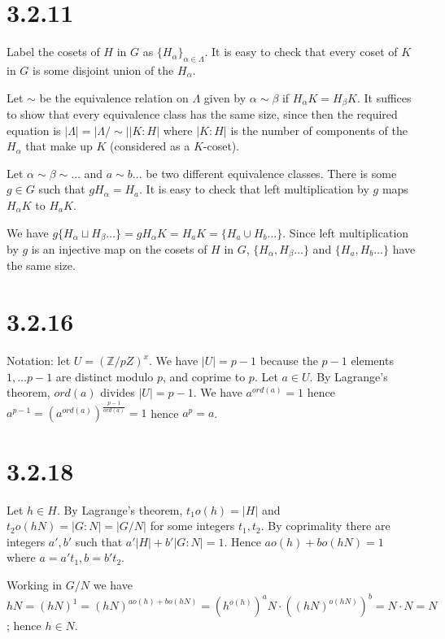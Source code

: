 \documentclass{article}
\def\Z{\mathbb{Z}}
\begin{document}
\section*{3.2.11}

Label the cosets of $H$ in $G$ as $\{H_\alpha\}_{\alpha \in \Lambda}$. It is easy to check that every coset of $K$ in $G$ is some disjoint union of the $H_\alpha$.

Let $\sim$ be the equivalence relation on $\Lambda$ given by $\alpha \sim \beta$ if $H_\alpha K = H_\beta K$. It suffices to show that every equivalence class has the same size, since then the required equation is $|\Lambda| = |\Lambda / \sim| |K:H|$ where $|K:H|$ is the number of components of the $H_\alpha$ that make up $K$ (considered as a $K$-coset).

Let $\alpha \sim \beta \sim \ldots$ and $a \sim b \ldots$ be two different equivalence classes. There is some $g \in G$ such that $g H_\alpha = H_a$. It is easy to check that left multiplication by $g$ maps $H_\alpha K$ to $H_a K$.

We have $g \{H_\alpha \sqcup H_\beta \ldots \} = gH_\alpha K = H_a K = \{H_a \cup H_b \ldots \}$. Since left multiplication by $g$ is an injective map on the cosets of $H$ in $G$, $\{H_\alpha, H_\beta \ldots \}$ and $\{H_a, H_b \ldots \}$ have the same size.

\section*{3.2.16}

Notation: let $U = (\Z/pZ)^x$. We have $|U| = p-1$ because the $p-1$ elements $1, \ldots p-1$ are distinct modulo $p$, and coprime to $p$. Let $a \in U$. By Lagrange's theorem, $ord(a)$ divides $|U| = p-1$. We have $a^{ord(a)} = 1$ hence $a^{p-1} = (a^{ord(a)})^{\frac{p-1}{ord(a)}} = 1$ hence $a^p = a$.

\section*{3.2.18}

Let $h \in H$. By Lagrange's theorem, $t_1 o(h) = |H|$ and $t_2 o(hN) = |G:N| = |G/N|$ for some integers $t_1, t_2$. By coprimality there are integers $a', b'$ such that $a' |H| + b' |G:N| = 1$. Hence $a o(h) + b o(hN) = 1$ where $a = a't_1, b = b't_2$.

Working in $G/N$ we have $hN = (hN)^1 = (hN)^{a o(h) + b o(hN)} = (h^{o(h)})^a N \cdot ((hN)^{o(hN)})^b = N \cdot N = N$; hence $h \in N$.
\end{document}
